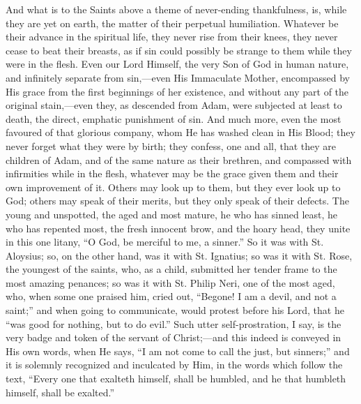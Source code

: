 And what is to the Saints above a theme of
never-ending thankfulness, is, while they are yet on
earth, the matter of their perpetual humiliation.
Whatever be their advance in the spiritual life, they
never rise from their knees, they never cease to beat
their breasts, as if sin could possibly be strange to
them while they were in the flesh. Even our Lord Himself,
the very Son of God in human nature, and infinitely
separate from sin,—even His Immaculate Mother,
encompassed by His grace from the first beginnings of her
existence, and without any part of the original
stain,—even they, as descended from Adam, were
subjected at least to death, the direct, emphatic
punishment of sin. And much more, even the most favoured
of that glorious company, whom He has washed clean in His
Blood; they never forget what they were by birth; they
confess, one and all, that they are children of Adam, and
of the same nature as their brethren, and compassed with
infirmities while in the flesh, whatever may be the grace
given them and their own improvement of it. Others may
look up to them, but they ever look up to God; others may
speak of their merits, but they only speak of their
defects. The young and unspotted, the aged and most
mature, he who has sinned least, he who has repented
most, the fresh innocent brow, and the hoary head, they
unite in this one litany, ``O God, be merciful to me,
a sinner.'' So it was with St. Aloysius; so, on the
other hand, was it with St. Ignatius; so was it with St.
Rose, the youngest of the saints, who, as a child,
submitted her tender frame to the most amazing penances;
so was it with St. Philip Neri, one of the most aged,
who, when some one praised him, cried out, ``Begone!
I am a devil, and not a saint;'' and when going to
communicate, would protest before his Lord, that he ``was
good for nothing, but to do evil.'' Such utter
self-prostration, I say, is the very badge and token of
the servant of Christ;—and this indeed is conveyed
in His own words, when He says, ``I am not come to
call the just, but sinners;'' and it is solemnly
recognized and inculcated by Him, in the words which
follow the text, ``Every one that exalteth himself,
shall be humbled, and he that humbleth himself, shall be
exalted.''

